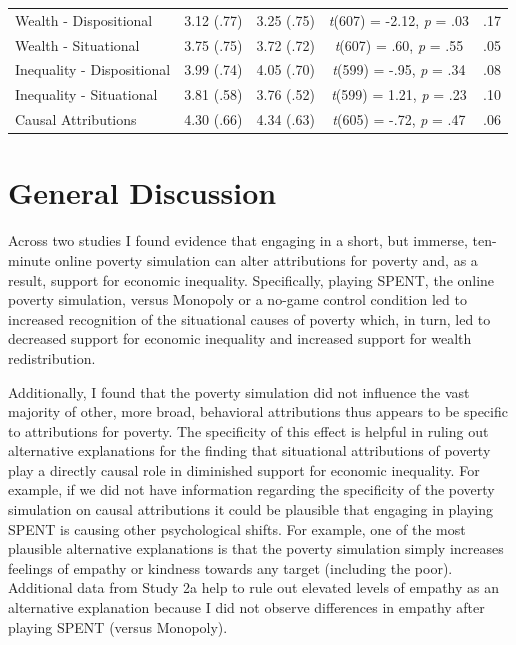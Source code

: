 \documentclass{sfuthesis}
\begin{document}
\begin{table}[h]
\begin{center}
\begin{tabular}{l c c c c}
      Wealth - Dispositional & \multicolumn{1}{c}{3.12 (.77)} & \multicolumn{1}{c}{3.25 (.75)} & \multicolumn{1}{c}{\textit{t}(607) = -2.12, \textit{p} = .03} & .17\\
      Wealth - Situational & \multicolumn{1}{c}{3.75 (.75)} & \multicolumn{1}{c}{3.72 (.72)} & \multicolumn{1}{c}{\textit{t}(607) = .60, \textit{p} = .55} & .05\\
      Inequality - Dispositional & \multicolumn{1}{c}{3.99 (.74)} & \multicolumn{1}{c}{4.05 (.70)} & \multicolumn{1}{c}{\textit{t}(599) = -.95, \textit{p} = .34} & .08\\
      Inequality - Situational & \multicolumn{1}{c}{3.81 (.58)} & \multicolumn{1}{c}{3.76 (.52)} & \multicolumn{1}{c}{\textit{t}(599) = 1.21, \textit{p} = .23} & .10\\
      Causal Attributions & \multicolumn{1}{c}{4.30 (.66)} & \multicolumn{1}{c}{4.34 (.63)} & \multicolumn{1}{c}{\textit{t}(605) = -.72, \textit{p} = .47} & .06\\
      \hline
    \end{tabular}
  \end{center}
\end{table}

\section{General Discussion}

Across two studies I found evidence that engaging in a short, but immerse, ten-minute online poverty simulation can alter attributions for poverty and, as a result, support for economic inequality. Specifically, playing SPENT, the online poverty simulation, versus Monopoly or a no-game control condition led to increased recognition of the situational causes of poverty which, in turn, led to decreased support for economic inequality and increased support for wealth redistribution.

Additionally, I found that the poverty simulation did not influence the vast majority of other, more broad, behavioral attributions thus appears to be specific to attributions for poverty. The specificity of this effect is helpful in ruling out alternative explanations for the finding that situational attributions of poverty play a directly causal role in diminished support for economic inequality. For example, if we did not have information regarding the specificity of the poverty simulation on causal attributions it could be plausible that engaging in playing SPENT is causing other psychological shifts. For example, one of the most plausible alternative explanations is that the poverty simulation simply increases feelings of empathy or kindness towards any target (including the poor). Additional data from Study 2a help to rule out elevated levels of empathy as an alternative explanation because I did not observe differences in empathy after playing SPENT (versus Monopoly).
\end{document}
